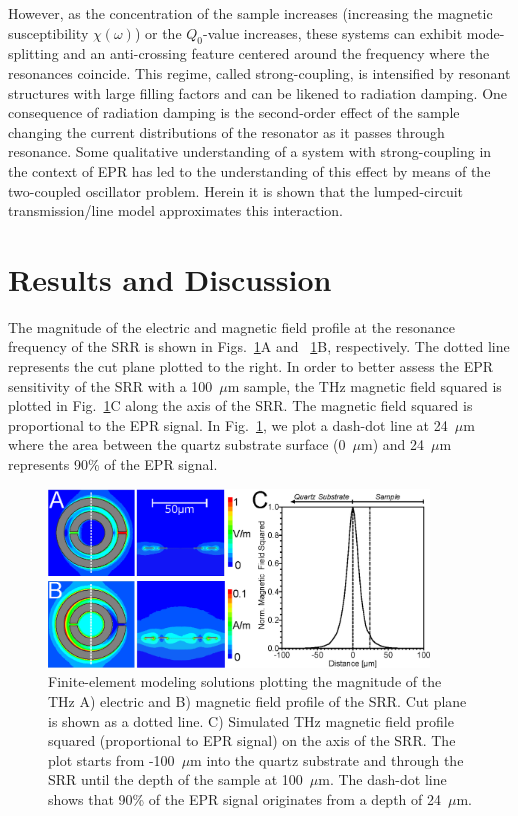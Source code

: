 However, as the concentration of the sample increases (increasing the magnetic susceptibility $\chi(\omega)$) or the $Q_0$-value increases, these systems can exhibit mode-splitting and an anti-crossing feature centered around the frequency where the resonances coincide. This regime, called strong-coupling, is intensified by resonant structures with large filling factors and can be likened to radiation damping. \cite{BloembergenRadDamp, BloomRadDamp, MeiboomRadDamp} One consequence of radiation damping is the second-order effect of the sample changing the current distributions of the resonator as it passes through resonance. Some qualitative understanding of a system with strong-coupling in the context of EPR has led to the understanding of this effect by means of the two-coupled oscillator problem. \cite{SchneiderEPR,BOERO2013133} Herein it is shown that the lumped-circuit transmission\-/line model approximates this interaction. 

\section{Results and Discussion}
The magnitude of the electric and magnetic field profile at the resonance frequency of the SRR is shown in Figs.~\ref{ch3-fig:HFSS}A and ~\ref{ch3-fig:HFSS}B, respectively. The dotted line represents the cut plane plotted to the right. In order to better assess the EPR sensitivity of the SRR with a 100~$\mu$m sample, the THz magnetic field squared is plotted in Fig.~\ref{ch3-fig:HFSS}C along the axis of the SRR. The magnetic field squared is proportional to the EPR signal. In Fig.~\ref{ch3-fig:HFSS}, we plot a dash-dot line at 24~$\mu$m where the area between the quartz substrate surface (0~$\mu$m) and 24~$\mu$m represents 90\% of the EPR signal.

\begin{figure}[htp]
\centering
  \includegraphics[width=0.9\textwidth]{Kapitel/Ch3-Images/02-AnsoftFields.eps}%
  \caption[Finite-element simulation solutions of SRR geometry.]{Finite-element modeling solutions plotting the magnitude of the THz A) electric and B) magnetic field profile of the SRR. Cut plane is shown as a dotted line. C) Simulated THz magnetic field profile squared (proportional to EPR signal) on the axis of the SRR. The plot starts from -100~$\mu$m into the quartz substrate and  through the SRR until the depth of the sample at 100~$\mu$m. The dash-dot line shows that 90\% of the EPR signal originates from a depth of 24~$\mu$m.}
  \label{ch3-fig:HFSS}
\end{figure}

